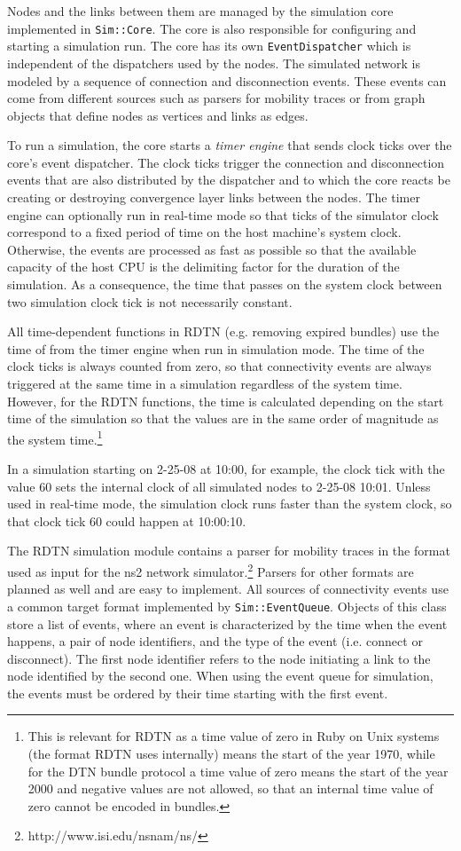 \documentclass{article}
\begin{document}
Nodes and the links between them are managed by the simulation core implemented
in {\tt Sim::Core}. The core is also responsible for configuring and starting a
simulation run. The core has its own {\tt EventDispatcher} which is independent
of the dispatchers used by the nodes. The simulated network is modeled by a
sequence of connection and disconnection events. These events can come from
different sources such as parsers for mobility traces or from graph objects that
define nodes as vertices and links as edges.

To run a simulation, the core starts a {\em timer engine} that sends clock ticks
over the core's event dispatcher. The clock ticks trigger the connection and
disconnection events that are also distributed by the dispatcher and to which
the core reacts be creating or destroying convergence layer links between the
nodes. The timer engine can optionally run in real-time mode so that ticks of
the simulator clock correspond to a fixed period of time on the host machine's
system clock. Otherwise, the events are processed as fast as possible so that
the available capacity of the host CPU is the delimiting factor for the duration
of the simulation. As a consequence, the time that passes on the system clock
between two simulation clock tick is not necessarily constant.

All time-dependent functions in RDTN (e.g. removing expired bundles) use the
time of from the timer engine when run in simulation mode.  The time of the
clock ticks is always counted from zero, so that connectivity events are always
triggered at the same time in a simulation regardless of the system time.
However, for the RDTN functions, the time is calculated depending on the start
time of the simulation so that the values are in the same order of magnitude as
the system time.\footnote{This is relevant for RDTN as a time value of zero in
Ruby on Unix systems (the format RDTN uses internally) means the start of the
year 1970, while for the DTN bundle protocol a time value of zero means the
start of the year 2000 and negative values are not allowed, so that an internal
time value of zero cannot be encoded in bundles.}

In a simulation starting on 2-25-08 at 10:00, for example, the clock tick
with the value $60$ sets the internal clock of all simulated nodes to 2-25-08
10:01. Unless used in real-time mode, the simulation clock runs faster than the
system clock, so that clock tick $60$ could happen at 10:00:10.

The RDTN simulation module contains a parser for mobility traces in the format
used as input for the ns2 network
simulator.\footnote{http://www.isi.edu/nsnam/ns/} Parsers for other formats are
planned as well and are easy to implement. All sources of connectivity events
use a common target format implemented by {\tt Sim::EventQueue}. Objects of this
class store a list of events, where an event is characterized by the time when
the event happens, a pair of node identifiers, and the type of the event (i.e.
connect or disconnect). The first node identifier refers to the node initiating
a link to the node identified by the second one. When using the event queue for
simulation, the events must be ordered by their time starting with the first
event.
\end{document}
